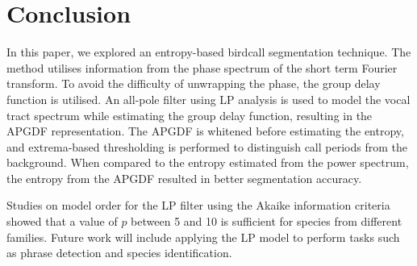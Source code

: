 \documentclass[a4paper]{article}
\begin{document}
 
 
 



 
\section{Conclusion}
\label{sec:conclusion}

In this paper, we explored an entropy-based birdcall segmentation technique. The
method utilises information from the phase spectrum of the short term Fourier
transform. To avoid the difficulty of unwrapping the phase, the group delay
function is utilised. An all-pole filter using LP analysis is used to model the
vocal tract spectrum while estimating the group delay function, resulting in the
APGDF representation. The APGDF is whitened before estimating the entropy, and
extrema-based thresholding is performed to distinguish call periods from the
background. When compared to the entropy estimated from the power spectrum, the
entropy from the APGDF resulted in better segmentation accuracy.

Studies on model order for the LP filter using the Akaike information criteria
showed that a value of $p$ between 5 and 10 is sufficient for species from
different families. Future work will include applying the LP model to perform
tasks such as phrase detection and species identification.

  \newpage
  \eightpt
  

  
\end{document}

